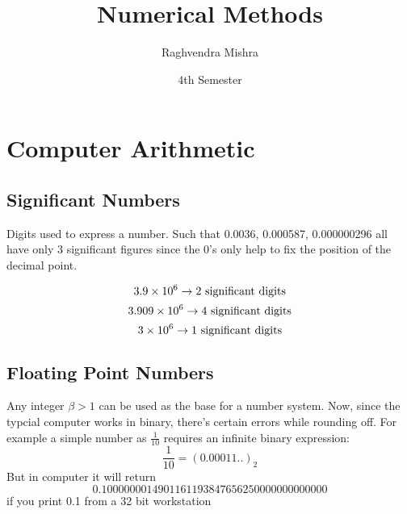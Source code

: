 \documentclass{article}
\title{Numerical Methods}
\author{Raghvendra Mishra}
\date{4th Semester}
\begin{document}
\maketitle

\section{Computer Arithmetic}

\subsection{Significant Numbers}

Digits used to express a number. Such that 0.0036, 0.000587, 0.000000296 all have
only 3 significant figures since the 0's only help to fix the position 
of the decimal point.

\[3.9\times10^6\to 2\textup{ significant digits}\]
\[3.909\times10^6\to 4\textup{ significant digits}\]
\[3\times10^6\to 1\textup{ significant digits}\]


\subsection{Floating Point Numbers}

Any integer $ \beta > 1 $ can be used as the base for a number system. 
Now, since the typcial computer works in binary, there's certain errors 
while rounding off.
For example a simple number as $ \frac{1}{10} $ requires an infinite binary
expression: \[\frac{1}{10} = (0.00011..)_2\]
But in computer it will return 
\[0.10000 00014 90116 11938 47656 25000 00000 00000\]
if you print 0.1 from a 32 bit workstation
\end{document}
